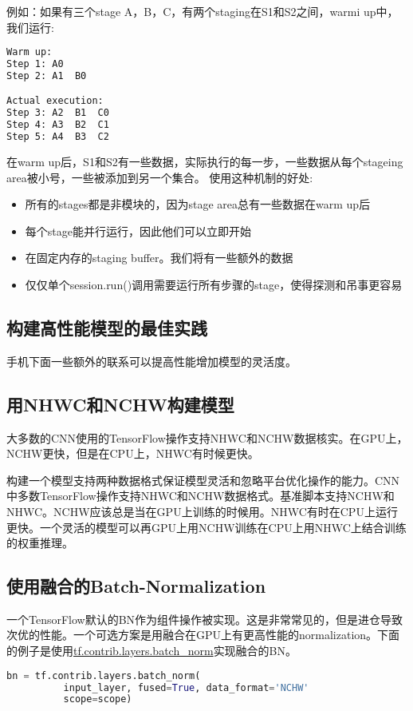 例如：如果有三个stage A，B，C，有两个staging在S1和S2之间，warmi up中，我们运行:
\begin{lstlisting}[language=Bash]
Warm up:
Step 1: A0
Step 2: A1  B0

Actual execution:
Step 3: A2  B1  C0
Step 4: A3  B2  C1
Step 5: A4  B3  C2
\end{lstlisting}
在warm up后，S1和S2有一些数据，实际执行的每一步，一些数据从每个stageing area被小号，一些被添加到另一个集合。
使用这种机制的好处:
\begin{itemize}
	\item 所有的stages都是非模块的，因为stage area总有一些数据在warm up后
	\item 每个stage能并行运行，因此他们可以立即开始
	\item 在固定内存的staging buffer。我们将有一些额外的数据
	\item 仅仅单个session.run()调用需要运行所有步骤的stage，使得探测和吊事更容易
\end{itemize}
\subsection{构建高性能模型的最佳实践}
手机下面一些额外的联系可以提高性能增加模型的灵活度。
\subsection{用NHWC和NCHW构建模型}
大多数的CNN使用的TensorFlow操作支持NHWC和NCHW数据核实。在GPU上，NCHW更快，但是在CPU上，NHWC有时候更快。

构建一个模型支持两种数据格式保证模型灵活和忽略平台优化操作的能力。CNN中多数TensorFlow操作支持NHWC和NCHW数据格式。基准脚本支持NCHW和NHWC。NCHW应该总是当在GPU上训练的时候用。NHWC有时在CPU上运行更快。一个灵活的模型可以再GPU上用NCHW训练在CPU上用NHWC上结合训练的权重推理。
\subsection{使用融合的Batch-Normalization}
一个TensorFlow默认的BN作为组件操作被实现。这是非常常见的，但是进仓导致次优的性能。一个可选方案是用融合在GPU上有更高性能的normalization。下面的例子是使用\href{https://www.tensorflow.org/api_docs/python/tf/contrib/layers/batch_norm}{tf.contrib.layers.batch\_norm}实现融合的BN。
\begin{lstlisting}[language=Python]
bn = tf.contrib.layers.batch_norm(
          input_layer, fused=True, data_format='NCHW'
          scope=scope)
\end{lstlisting}
